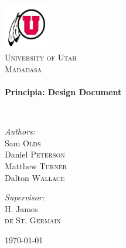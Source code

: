 \begin{titlepage}
\begin{center}

\includegraphics[width=0.15\textwidth]{logo}~\\[1 cm]

\textsc{\LARGE University of Utah}\\[1.5 cm]

\textsc{\Large Madadasa}\\[1.5 cm]

\HRule \\[0.4 cm]
{  \huge \bfseries Principia: Design Document
	\\[0.4 cm]}

\HRule \\[1.5 cm]

\noindent
\begin{minipage}{0.4\textwidth}
\begin{flushleft} \large
\emph{Authors:}\\
Sam \textsc{Olds}\\
Daniel \textsc{Peterson}\\
Matthew \textsc{Turner} \\
Dalton \textsc{Wallace}\\
\end{flushleft}
\end{minipage}%
\begin{minipage}{0.4\textwidth}
\begin{flushright} \large
\emph{Supervisor:} \\
H. James \\ \textsc{de St. Germain}
\end{flushright}
\end{minipage}

\vfill

{\large \today}

\end{center}
\end{titlepage}